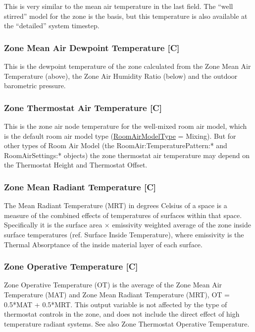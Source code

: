This is very similar to the mean air temperature in the last field. The ``well stirred'' model for the zone is the basis, but this temperature is also available at the ``detailed'' system timestep.

\subsubsection{Zone Mean Air Dewpoint Temperature {[}C{]}}\label{zone-mean-air-dewpoint-temperature-c}

This is the dewpoint temperature of the zone calculated from the Zone Mean Air Temperature (above), the Zone Air Humidity Ratio (below) and the outdoor barometric pressure.

\subsubsection{Zone Thermostat Air Temperature {[}C{]}}\label{zone-thermostat-air-temperature-c}

This is the zone air node temperature for the well-mixed room air model, which is the default room air model type (\hyperref[roomairmodeltype]{RoomAirModelType} = Mixing). But for other types of Room Air Model (the RoomAir:TemperaturePattern:* and RoomAirSettings:* objects) the zone thermostat air temperature may depend on the Thermostat Height and Thermostat Offset.

\subsubsection{Zone Mean Radiant Temperature {[}C{]}}\label{zone-mean-radiant-temperature-c}

The Mean Radiant Temperature (MRT) in degrees Celsius of a space is a measure of the combined effects of temperatures of surfaces within that space. Specifically it is the surface area × emissivity weighted average of the zone inside surface temperatures (ref. Surface Inside Temperature), where emissivity is the Thermal Absorptance of the inside material layer of each surface.

\subsubsection{Zone Operative Temperature {[}C{]}}\label{zone-operative-temperature-c}

Zone Operative Temperature (OT) is the average of the Zone Mean Air Temperature (MAT) and Zone Mean Radiant Temperature (MRT), OT = 0.5*MAT + 0.5*MRT. This output variable is not affected by the type of thermostat controls in the zone, and does not include the direct effect of high temperature radiant systems. See also Zone Thermostat Operative Temperature.

